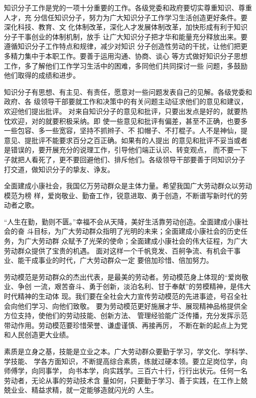 \documentclass[11pt]{ctexart}
\begin{document}
{{{{知识分子工作是党的一项十分重要的工作。各级党委和政府要切实尊重知识、尊重人才，充
分信任知识分子，努力为广大知识分子工作学习生活创造更好条件。要深化科技、教育、文
化体制改革，深化人才发展体制改革，加快形成有利于知识分子干事创业的体制机制，放手
让广大知识分子把才华和能量充分释放出来。要遵循知识分子工作特点和规律，减少对知识
分子创造性劳动的干扰，让他们把更多精力集中于本职工作。要善于运用沟通、协商、谈心
等方式做好知识分子思想工作，多了解他们工作学习生活中的困难，多同他们共同探讨一些
问题，多鼓励他们取得的成绩和进步。

知识分子有思想、有主见、有责任，愿意对一些问题发表自己的见解。各级党委和政府、各
级领导干部要就工作和决策中的有关问题主动征求他们的意见和建议，欢迎他们提出批评。
对来自知识分子的意见和批评，只要出发点是好的，就要热忱欢迎，对的就要积极采纳。即
使一些意见和批评有偏差，甚至不正确，也要多一些包容、多一些宽容，坚持不抓辫子、不
扣帽子、不打棍子。人不是神仙，提意见、提批评不能要求百分之百正确。如果有的人提出
的意见和批评不妥当或者是错误的，要开展充分的说理工作，引导他们端正认识、转变观点，
而不要一下子就把人看死了，更不要回避他们、排斥他们。各级领导干部要善于同知识分子
打交道，做知识分子的挚友、诤友。

全面建成小康社会，我国亿万劳动群众是主体力量。希望我国广大劳动群众以劳动模范为榜
样，爱岗敬业、勤奋工作，锐意进取、勇于创造，不断谱写新时代的劳动者之歌。

“人生在勤，勤则不匮。”幸福不会从天降，美好生活靠劳动创造。全面建成小康社会的奋
斗目标，为广大劳动群众指明了光明的未来；全面建成小康社会的历史任务，为广大劳动群
众赋予了光荣的使命；全面建成小康社会的伟大征程，为广大劳动群众提供了宝贵的机遇。
面对这样一个千帆竞发、百舸争流、有机会干事业、能干成事业的时代，广大劳动群众一定
要倍加珍惜、倍加努力。

劳动模范是劳动群众的杰出代表，是最美的劳动者。劳动模范身上体现的“爱岗敬业、争创
一流，艰苦奋斗、勇于创新，淡泊名利、甘于奉献”的劳模精神，是伟大时代精神的生动体
现。我们要在全社会大力宣传劳动模范的先进事迹，号召全社会向他们学习、向他们致敬。
要为劳动模范更好施展才华、展现精神品格提供全方位支持，使他们的劳动技能、创新方法、
管理经验能广泛传播，充分发挥示范带动作用。劳动模范要珍惜荣誉、谦虚谨慎、再接再厉，
不断在新的起点上为党和人民创造更大业绩。

素质是立身之基，技能是立业之本。广大劳动群众要勤于学习，学文化、学科学、学技能、
学各方面知识，不断提高综合素质，练就过硬本领。要立足岗位学，向师傅学，向同事学，
向书本学，向实践学。三百六十行，行行出状元。任何一名劳动者，无论从事的劳动技术含
量如何，只要勤于学习、善于实践，在工作上兢兢业业、精益求精，就一定能够造就闪光的
人生。

}}}}
\end{document}
